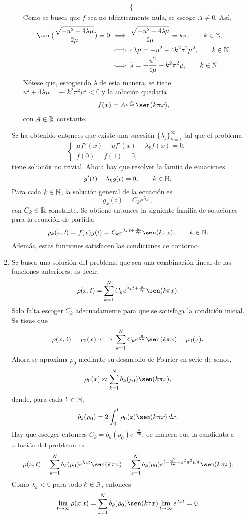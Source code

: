 \documentclass[11pt]{report}
\begin{document}
\begin{solution}
\begin{enumerate}
\begin{itemize}
\begin{align*}
\begin{cases}
                \end{cases}
            \end{align*}
            Como se busca que $f$ sea no idénticamente nula, se escoge $A \neq 0$. Así,
            \begin{align*}
                \sen\bigl(\frac{\sqrt{-u^2-4\lambda\mu}}{2\mu}\bigr) = 0 &\iff \frac{\sqrt{-u^2-4\lambda\mu}}{2\mu} = k\pi, \qquad k \in \Z, \\
                &\iff 4\lambda\mu=-u^2-4k^2\pi^2\mu^2, \qquad k \in \N, \\
                &\iff \lambda = -\frac{u^2}{4\mu}-k^2\pi^2\mu, \qquad k \in \N.
            \end{align*}
            Nótese que, escogiendo $\lambda$ de esta manera, se tiene $u^2+4\lambda \mu = -4k^2\pi^2\mu^2 < 0$ y la solución quedaría
            \[f(x) = Ae^{\frac{u}{2\mu}}\sen\bigl(k\pi x\bigr),\]
            con $A \in \mathbb R$ constante.
        \end{itemize}
        Se ha obtenido entonces que existe una sucesión $\{\lambda_k\}_{k=1}^\infty$ tal que el problema 
        \[\begin{cases}
            \mu f''(x) - uf'(x) - \lambda_k f(x) = 0, \\
            f(0) = f(1) = 0,
        \end{cases}\]
        tiene solución no trivial. Ahora hay que resolver la famiia de ecuaciones
        \[g'(t) -\lambda_k g(t) = 0, \qquad k \in \mathbb N.\]
        Para cada $k \in \mathbb N$, la solución general de la ecuación es
        \[g_k(t) = C_ke^{\lambda_kt},\]
        con $C_k\in\mathbb R$ constante. Se obtiene entonces la siguiente familia de soluciones para la ecuación de partida:
        \[\rho_k(x,t) = f(x)g(t) = C_ke^{\lambda_kt+\frac{u}{2\mu}}\sen(k\pi x), \qquad k \in \N.\]
        Además, estas funciones satisfacen las condiciones de contorno.
        \item Se busca una solución del problema que sea una combinación lineal de las funciones anteriores, es decir,
        \[\rho(x,t) = \sum_{k=1}^N C_ke^{\lambda_kt+\frac{u}{2\mu}}\sen(k\pi x).\]
        Solo falta escoger $C_k$ adecuadamente para que se satisfaga la condición inicial. Se tiene que
        \[\rho(x,0) = \rho_0(x) \iff \sum_{k=1}^N C_ke^{\frac{u}{2\mu}}\sen(k\pi x) = \rho_0(x).\]
        Ahora se aproxima $\rho_0$ mediante su desarrollo de Fourier en serie de senos,
        \[\rho_0(x) \approx \sum_{k=1}^N b_k(\rho_0)\sen(k\pi x),\]
        donde, para cada $k\in\mathbb N$,
        \[b_k(\rho_0) = 2\int_0^1\rho_0(x)\sen(k\pi x)\, dx.\]
        Hay que escoger entonces $C_k = b_k(\rho_0)e^{-\frac{u}{2\mu}}$, de manera que la candidata a solución del problema es
        \[\rho(x,t) = \sum_{k=1}^Nb_k(\rho_0)e^{\lambda_kt}\sen(k\pi x) =  \sum_{k=1}^Nb_k(\rho_0)e^{(-\frac{u^2}{4\mu}-k^2\pi^2\mu)t}\sen(k\pi x).\]
        Como $\lambda_k<0$ para todo $k \in \mathbb N$, entonces
        \[\lim_{t\to\infty}\rho(x,t) = \sum_{k=1}^Nb_k(\rho_0)\sen(k\pi x)\lim_{t\to\infty}e^{\lambda_kt} = 0.\]
    \end{enumerate}

\end{solution}
\end{document}
